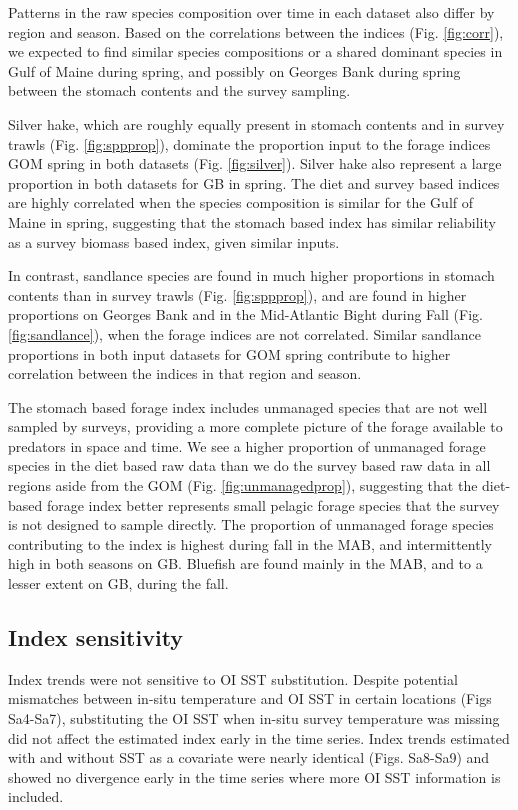 \documentclass[
]{article}
\begin{document}
Patterns in the raw species composition over time in each dataset also differ by region and season. Based on the correlations between the indices (Fig. \ref{fig:corr}), we expected to find similar species compositions or a shared dominant species in Gulf of Maine during spring, and possibly on Georges Bank during spring between the stomach contents and the survey sampling.

Silver hake, which are roughly equally present in stomach contents and in survey trawls (Fig. \ref{fig:sppprop}), dominate the proportion input to the forage indices GOM spring in both datasets (Fig. \ref{fig:silver}). Silver hake also represent a large proportion in both datasets for GB in spring. The diet and survey based indices are highly correlated when the species composition is similar for the Gulf of Maine in spring, suggesting that the stomach based index has similar reliability as a survey biomass based index, given similar inputs.

In contrast, sandlance species are found in much higher proportions in stomach contents than in survey trawls (Fig. \ref{fig:sppprop}), and are found in higher proportions on Georges Bank and in the Mid-Atlantic Bight during Fall (Fig. \ref{fig:sandlance}), when the forage indices are not correlated. Similar sandlance proportions in both input datasets for GOM spring contribute to higher correlation between the indices in that region and season.

The stomach based forage index includes unmanaged species that are not well sampled by surveys, providing a more complete picture of the forage available to predators in space and time. We see a higher proportion of unmanaged forage species in the diet based raw data than we do the survey based raw data in all regions aside from the GOM (Fig. \ref{fig:unmanagedprop}), suggesting that the diet-based forage index better represents small pelagic forage species that the survey is not designed to sample directly. The proportion of unmanaged forage species contributing to the index is highest during fall in the MAB, and intermittently high in both seasons on GB. Bluefish are found mainly in the MAB, and to a lesser extent on GB, during the fall.

\hypertarget{index-sensitivity-1}{%
\subsection{Index sensitivity}\label{index-sensitivity-1}}

Index trends were not sensitive to OI SST substitution. Despite potential mismatches between in-situ temperature and OI SST in certain locations (Figs Sa4-Sa7), substituting the OI SST when in-situ survey temperature was missing did not affect the estimated index early in the time series. Index trends estimated with and without SST as a covariate were nearly identical (Figs. Sa8-Sa9) and showed no divergence early in the time series where more OI SST information is included.
\end{document}
